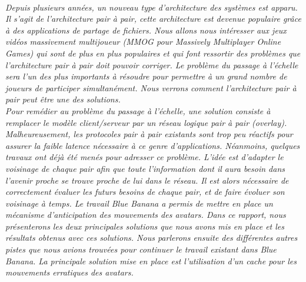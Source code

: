 \\
	\par \textit{Depuis plusieurs années, un nouveau type d'architecture des systèmes est apparu. Il s'agit de l'architecture pair à pair, cette architecture est devenue populaire grâce à des applications de partage de fichiers. Nous allons nous intéresser aux jeux vidéos massivement multijoueur (MMOG pour Massively Multiplayer Online Games) qui sont de plus en plus populaires et qui font ressortir des problèmes que l'architecture pair à pair doit pouvoir corriger. Le problème du passage à l'échelle sera l'un des plus importants à résoudre pour permettre à un grand nombre de joueurs de participer simultanément. Nous verrons comment l'architecture pair à pair peut être une des solutions.\\ 
	 Pour remédier au problème du passage à l'échelle, une solution consiste à remplacer le modèle client/serveur par un réseau logique pair à pair (overlay). Malheureusement, les protocoles pair à pair existants sont trop peu réactifs pour assurer la faible latence nécessaire à ce genre d’applications. Néanmoins, quelques travaux ont déjà été menés pour adresser ce problème. L’idée est d’adapter le voisinage de chaque pair afin que toute l’information dont il aura besoin dans l'avenir proche se trouve proche de lui dans le réseau. Il est alors nécessaire de correctement évaluer les futurs besoins de chaque pair, et de faire évoluer son voisinage à temps. Le travail Blue Banana a permis de mettre en place un mécanisme d'anticipation des mouvements des avatars. Dans ce rapport, nous présenterons les deux principales solutions que nous avons mis en place et les résultats obtenus avec ces solutions. Nous parlerons ensuite des différentes autres pistes que nous avions trouvées pour continuer le travail existant dans Blue Banana. La principale solution mise en place est l'utilisation d'un cache pour les mouvements erratiques des avatars.}\\
